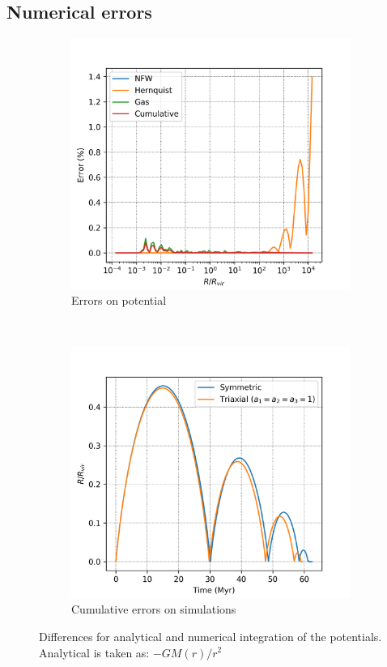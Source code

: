 	\subsection{Numerical errors}
	\begin{figure}[h]
		\centering
		\begin{subfigure}[b]{0.49\textwidth}
			\includegraphics[width = \textwidth]{"../Files/Week 7/error"}
			\caption{Errors on potential}
			\label{fig: potentialErrors}
		\end{subfigure}
		~ 
		\begin{subfigure}[b]{0.49\textwidth}
			\includegraphics[width=\textwidth]{"../Files/Week 7/symmetric_triaxial"}
			\caption{Cumulative errors on simulations}
			\label{fig: simulationErrors}
		\end{subfigure}
		\caption{Differences for analytical and numerical integration of the potentials. Analytical is taken as: $-GM(r) / r^2$}
		\label{fig: numericalErrors}
	\end{figure}

